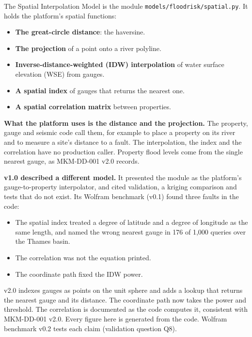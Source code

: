 \documentclass[11pt,a4paper]{article}
\begin{document}
\sloppy
\mkmtitlepage
\mkmlegalpage
\tableofcontents
\clearpage

\mkmexecsummary

The Spatial Interpolation Model is the module \texttt{models/floodrisk/spatial.py}. It
holds the platform's spatial functions:
\begin{itemize}[nosep]
    \item \textbf{The great-circle distance}: the haversine.
    \item \textbf{The projection} of a point onto a river polyline.
    \item \textbf{Inverse-distance-weighted (IDW) interpolation} of water surface elevation
          (WSE) from gauges.
    \item \textbf{A spatial index} of gauges that returns the nearest one.
    \item \textbf{A spatial correlation matrix} between properties.
\end{itemize}

\textbf{What the platform uses is the distance and the projection.} The property, gauge and
seismic code call them, for example to place a property on its river and to measure a
site's distance to a fault. The interpolation, the index and the correlation have no
production caller. Property flood levels come from the single nearest gauge, as MKM-DD-001
v2.0 records.

\textbf{v1.0 described a different model.} It presented the module as the platform's
gauge-to-property interpolator, and cited validation, a kriging comparison and tests that
do not exist. Its Wolfram benchmark (v0.1) found three faults in the code:
\begin{itemize}[nosep]
    \item The spatial index treated a degree of latitude and a degree of longitude as the
          same length, and named the wrong nearest gauge in 176 of 1{,}000 queries over the
          Thames basin.
    \item The correlation was not the equation printed.
    \item The coordinate path fixed the IDW power.
\end{itemize}
v2.0 indexes gauges as points on the unit sphere and adds a lookup that returns the nearest
gauge and its distance. The coordinate path now takes the power and threshold. The
correlation is documented as the code computes it, consistent with MKM-DD-001 v2.0. Every
figure here is generated from the code. Wolfram benchmark v0.2 tests each claim
(validation question Q8).
\end{document}
